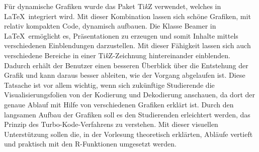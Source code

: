 Für dynamische Grafiken wurde das Paket Ti\textit{k}Z verwendet, welches in \LaTeX\ integriert wird. Mit dieser Kombination lassen sich schöne Grafiken, mit relativ kompakten Code, dynamisch aufbauen. Die Klasse Beamer in \LaTeX\ ermöglicht es, Präsentationen zu erzeugen und somit Inhalte mittels verschiedenen Einblendungen darzustellen. Mit dieser Fähigkeit lassen sich auch verschiedene Bereiche in einer Ti\textit{k}Z-Zeichnung hintereinander einblenden. Dadurch erhält der Benutzer einen besseren Überblick über die Entstehung der Grafik und kann daraus besser ableiten, wie der Vorgang abgelaufen ist. Diese Tatsache ist vor allem wichtig, wenn sich zukünftige Studierende die Visualisierungsfolien von der Kodierung und Dekodierung anschauen, da dort der genaue Ablauf mit Hilfe von verschiedenen Grafiken erklärt ist. Durch den langsamen Aufbau der Grafiken soll es den Studierenden erleichtert werden, das Prinzip des Turbo-Kode-Verfahrens zu verstehen. Mit dieser visuellen Unterstützung sollen die, in der Vorlesung theoretisch erklärten, Abläufe vertieft und praktisch mit den R-Funktionen umgesetzt werden.  
